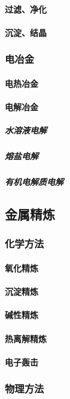 \documentclass[UTF8]{../../ApplicationUniverse}
\begin{document}
            \paragraph{过滤、净化}
            \paragraph{沉淀、结晶}
        \subsubsection{电冶金}
            \paragraph{电热冶金}
            \paragraph{电解冶金}
                \subparagraph{水溶液电解}
                \subparagraph{熔盐电解}
                \subparagraph{有机电解质电解}
    \subsection{金属精炼}
        \subsubsection{化学方法}
            \paragraph{氧化精炼}
            \paragraph{沉淀精炼}
            \paragraph{碱性精炼}
            \paragraph{热离解精炼}
            \paragraph{电子轰击}
        \subsubsection{物理方法}
\end{document}
